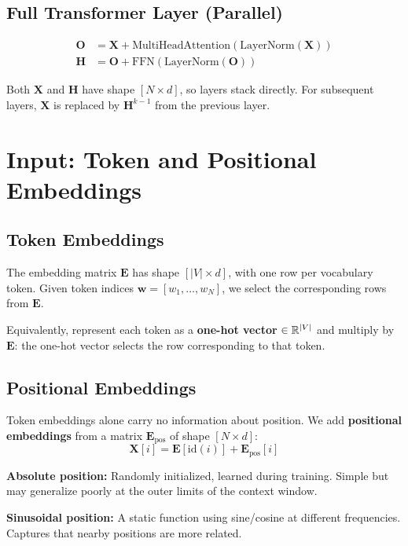 \documentclass[main.tex]{subfiles}
\begin{document}
\subsection{Full Transformer Layer (Parallel)}

\begin{align}
\mathbf{O} &= \mathbf{X} + \text{MultiHeadAttention}(\text{LayerNorm}(\mathbf{X})) \tag{8.38} \\
\mathbf{H} &= \mathbf{O} + \text{FFN}(\text{LayerNorm}(\mathbf{O})) \tag{8.39}
\end{align}

Both $\mathbf{X}$ and $\mathbf{H}$ have shape $[N \times d]$, so layers stack directly. For subsequent layers, $\mathbf{X}$ is replaced by $\mathbf{H}^{k-1}$ from the previous layer.

\section{Input: Token and Positional Embeddings}

\subsection{Token Embeddings}

The embedding matrix $\mathbf{E}$ has shape $[|V| \times d]$, with one row per vocabulary token. Given token indices $\mathbf{w} = [w_1, \ldots, w_N]$, we select the corresponding rows from $\mathbf{E}$.

Equivalently, represent each token as a \textbf{one-hot vector} $\in \mathbb{R}^{|V|}$ and multiply by $\mathbf{E}$: the one-hot vector selects the row corresponding to that token.

\subsection{Positional Embeddings}

Token embeddings alone carry no information about position. We add \textbf{positional embeddings} from a matrix $\mathbf{E}_{\text{pos}}$ of shape $[N \times d]$:
$$\mathbf{X}[i] = \mathbf{E}[\text{id}(i)] + \mathbf{E}_{\text{pos}}[i]$$

\textbf{Absolute position:} Randomly initialized, learned during training. Simple but may generalize poorly at the outer limits of the context window.

\textbf{Sinusoidal position:} A static function using sine/cosine at different frequencies. Captures that nearby positions are more related.
\end{document}
